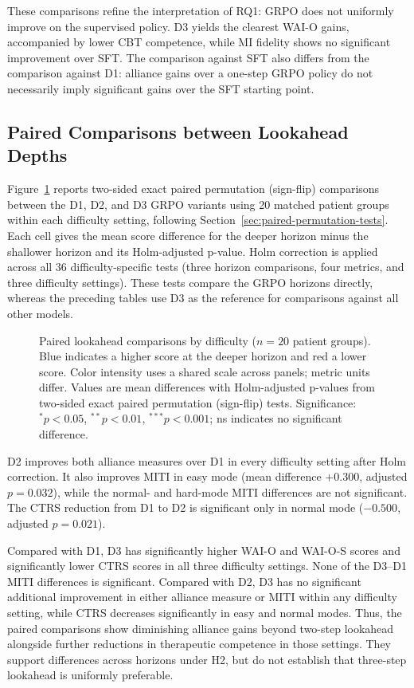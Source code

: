 These comparisons refine the interpretation of RQ1: GRPO does not uniformly improve on the supervised policy. D3 yields the clearest WAI-O gains, accompanied by lower CBT competence, while MI fidelity shows no significant improvement over SFT. The comparison against SFT also differs from the comparison against D1: alliance gains over a one-step GRPO policy do not necessarily imply significant gains over the SFT starting point.

\subsection{Paired Comparisons between Lookahead Depths}

Figure~\ref{fig:lookahead-comparisons} reports two-sided exact paired permutation (sign-flip) comparisons between the D1, D2, and D3 GRPO variants using 20 matched patient groups within each difficulty setting, following Section~\ref{sec:paired-permutation-tests}. Each cell gives the mean score difference for the deeper horizon minus the shallower horizon and its Holm-adjusted p-value. Holm correction is applied across all 36 difficulty-specific tests (three horizon comparisons, four metrics, and three difficulty settings). These tests compare the GRPO horizons directly, whereas the preceding tables use D3 as the reference for comparisons against all other models.

\begin{figure}[H]
\centering

\caption{Paired lookahead comparisons by difficulty ($n=20$ patient groups). Blue indicates a higher score at the deeper horizon and red a lower score. Color intensity uses a shared scale across panels; metric units differ. Values are mean differences with Holm-adjusted p-values from two-sided exact paired permutation (sign-flip) tests. Significance: $^{*}p<0.05$, $^{**}p<0.01$, $^{***}p<0.001$; ns indicates no significant difference.}
\label{fig:lookahead-comparisons}
\end{figure}

D2 improves both alliance measures over D1 in every difficulty setting after Holm correction. It also improves MITI in easy mode (mean difference $+0.300$, adjusted $p=0.032$), while the normal- and hard-mode MITI differences are not significant. The CTRS reduction from D1 to D2 is significant only in normal mode ($-0.500$, adjusted $p=0.021$).

Compared with D1, D3 has significantly higher WAI-O and WAI-O-S scores and significantly lower CTRS scores in all three difficulty settings. None of the D3--D1 MITI differences is significant. Compared with D2, D3 has no significant additional improvement in either alliance measure or MITI within any difficulty setting, while CTRS decreases significantly in easy and normal modes. Thus, the paired comparisons show diminishing alliance gains beyond two-step lookahead alongside further reductions in therapeutic competence in those settings. They support differences across horizons under H2, but do not establish that three-step lookahead is uniformly preferable.


